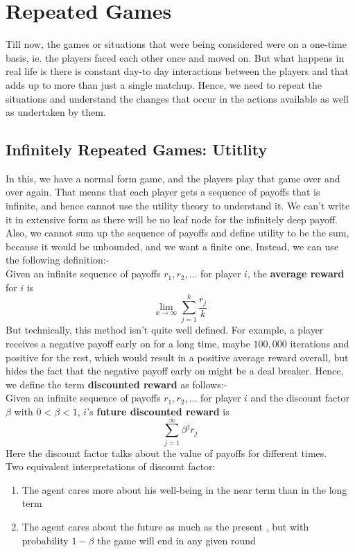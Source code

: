 \section{Repeated Games}
Till now, the games or situations that were being considered were on a one-time basis, ie. the players faced each other once and moved on. But what happens in real life is there is constant day-to day interactions between the players and that adds up to more than just a single matchup. Hence, we need to repeat the situations and understand the changes that occur in the actions available as well as undertaken by them.

\subsection{Infinitely Repeated Games: Utitlity}
In this, we have a normal form game, and the players play that game over and over again. That means that each player gets a sequence of payoffs that is infinite, and hence cannot use the utility theory to understand it. We can't write it in extensive form as there will be no leaf node for the infinitely deep payoff. Also, we cannot sum up the sequence of payoffs and define utility to be the sum,  because it would be unbounded, and we want a finite one. Instead, we can use the following definition:-\\
\newline
Given an infinite sequence of payoffs $r_1, r_2, \dots$ for player $i$, the \textbf{average reward} for $i$ is $$\lim_{x\to \infty} \sum_{j=1}^{k} \frac{r_j}{k}$$
But technically, this method isn't quite well defined. For example, a player receives a negative payoff early on for a long time,  maybe $100,000$ iterations and positive for the rest, which would result in a positive average reward overall, but hides the fact that the negative payoff early on might be a deal breaker. Hence, we define the term \textbf{discounted reward} as follows:-\\
\newline
Given an infinite sequence of payoffs $r_1, r_2, \dots$ for player $i$ and the discount factor $\beta$ with $0 < \beta < 1$, $i$'s \textbf{future discounted reward} is $$\sum_{j=1}^\infty \beta^j r_j$$
Here the discount factor talks about the value of payoffs for different times.\\
\newline
Two equivalent interpretations of discount factor:
\begin{enumerate}
\item The agent cares more about his well-being in the near term than in the long term
\item The agent cares about the future as much as the present , but with probability $1-\beta$ the game will end in any given round
\end{enumerate}

